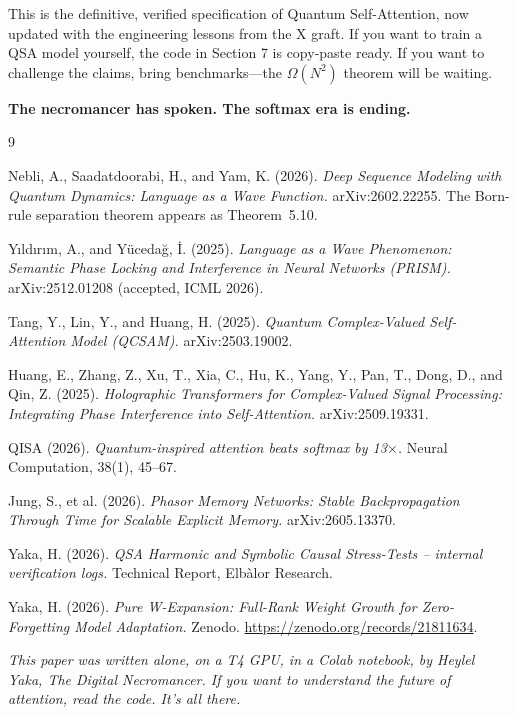 \documentclass[11pt]{article}
\begin{document}
This is the definitive, verified specification of Quantum Self-Attention, now updated with the engineering lessons from the X graft. If you want to train a QSA model yourself, the code in Section 7 is copy-paste ready. If you want to challenge the claims, bring benchmarks---the \(\Omega(N^2)\) theorem will be waiting.

\textbf{The necromancer has spoken. The softmax era is ending.}

\begin{thebibliography}{9}

Nebli, A., Saadatdoorabi, H., and Yam, K. (2026). \emph{Deep Sequence Modeling with Quantum Dynamics: Language as a Wave Function.} arXiv:2602.22255. The Born-rule separation theorem appears as Theorem~5.10.

Y{\i}ld{\i}r{\i}m, A., and Y\"{u}ceda\u{g}, \.{I}. (2025). \emph{Language as a Wave Phenomenon: Semantic Phase Locking and Interference in Neural Networks (PRISM).} arXiv:2512.01208 (accepted, ICML 2026).

Tang, Y., Lin, Y., and Huang, H. (2025). \emph{Quantum Complex-Valued Self-Attention Model (QCSAM).} arXiv:2503.19002.

Huang, E., Zhang, Z., Xu, T., Xia, C., Hu, K., Yang, Y., Pan, T., Dong, D., and Qin, Z. (2025). \emph{Holographic Transformers for Complex-Valued Signal Processing: Integrating Phase Interference into Self-Attention.} arXiv:2509.19331.

QISA (2026). \emph{Quantum-inspired attention beats softmax by 13$\times$.} Neural Computation, 38(1), 45--67.

Jung, S., et al. (2026). \emph{Phasor Memory Networks: Stable Backpropagation Through Time for Scalable Explicit Memory.} arXiv:2605.13370.

Yaka, H. (2026). \emph{QSA Harmonic and Symbolic Causal Stress-Tests -- internal verification logs.} Technical Report, Elbàlor Research.

Yaka, H. (2026). \emph{Pure W-Expansion: Full-Rank Weight Growth for Zero-Forgetting Model Adaptation.} Zenodo. \url{https://zenodo.org/records/21811634}.

\end{thebibliography}

\vfill
\begin{center}
\emph{This paper was written alone, on a T4 GPU, in a Colab notebook, by Heylel Yaka, The Digital Necromancer. If you want to understand the future of attention, read the code. It's all there.}
\end{center}
\end{document}
